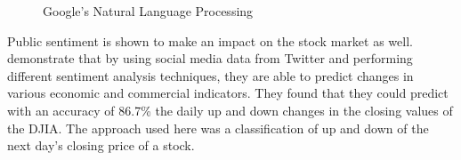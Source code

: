 \documentclass[11pt]{article}
\begin{document}
\begin{figure}[!ht]
	\centering
	\caption{Google's Natural Language Processing}
	\label{fig:nlp-example}
\end{figure}
Public sentiment is shown to make an impact on the stock market as well. \citet{Bollen2011TwitterMarket} demonstrate that by using social media data from Twitter and performing different sentiment analysis techniques, they are able to predict changes in various economic and commercial indicators. They found that they could predict with an accuracy of 86.7\% the daily up and down changes in the closing values of the DJIA. The approach used here was a classification of up and down of the next day's closing price of a stock.
\end{document}
